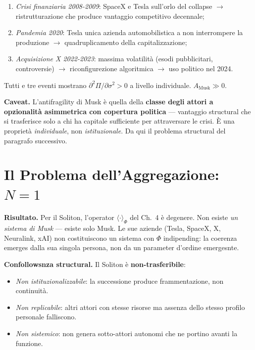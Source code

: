 \begin{enumerate}
\def\labelenumi{\arabic{enumi}.}
\tightlist
\item
  \emph{Crisi finanziaria 2008-2009}: SpaceX e Tesla sull'orlo del
  collapse $\to$ ristrutturazione che produce vantaggio competitivo
  decennale;
\item
  \emph{Pandemia 2020}: Tesla unica azienda automobilistica a non
  interrompere la produzione $\to$ quadruplicamento della capitalizzazione;
\item
  \emph{Acquisizione X 2022-2023}: massima volatilità (esodi
  pubblicitari, controversie) $\to$ riconfigurezione algoritmica $\to$ uso
  politico nel 2024.
\end{enumerate}

\Proved{} Tutti e tre eventi mostrano
\(\partial^2 \Pi / \partial \sigma^2 > 0\) a livello individuale.
\(A_{\text{Musk}} \gg 0\).

\Conj{} \textbf{Caveat.} L'antifragility di Musk è quella della
\textbf{classe degli attori a opzionalità asimmetrica con copertura
politica} --- vantaggio structural che si trasferisce solo a chi ha
capitale sufficiente per attraversare le crisi. È una proprietà
\emph{individuale}, non \emph{istituzionale}. Da qui il problema
structural del paragrafo successivo.



\section{\texorpdfstring{Il Problema dell'Aggregazione:
\(N = 1\)}{Il Problema dell'Aggregazione: N = 1}}\label{il-problema-dellaggregazione-n-1}

\Proved{} \textbf{Risultato.} Per il Soliton, l'operator
\(\langle\cdot\rangle_\Phi\) del Ch.~4 è degenere. Non esiste \emph{un
sistema di Musk} --- esiste solo Musk. Le sue aziende (Tesla, SpaceX, X,
Neuralink, xAI) non costituiscono un sistema con \(\Phi\) indipending:
la coerenza emerges dalla sua singola persona, non da un parameter
d'ordine emergesnte.

\Hypoth{} \textbf{Confollowsnza structural.} Il Soliton è
\textbf{non-trasferibile}:

\begin{itemize}
\tightlist
\item
  \emph{Non istituzionalizzabile}: la successione produce
  frammentazione, non continuità.
\item
  \emph{Non replicabile}: altri attori con stesse risorse ma assenza
  dello stesso profilo personale falliscono.
\item
  \emph{Non sistemico}: non genera sotto-attori autonomi che ne portino
  avanti la funzione.
\end{itemize}

